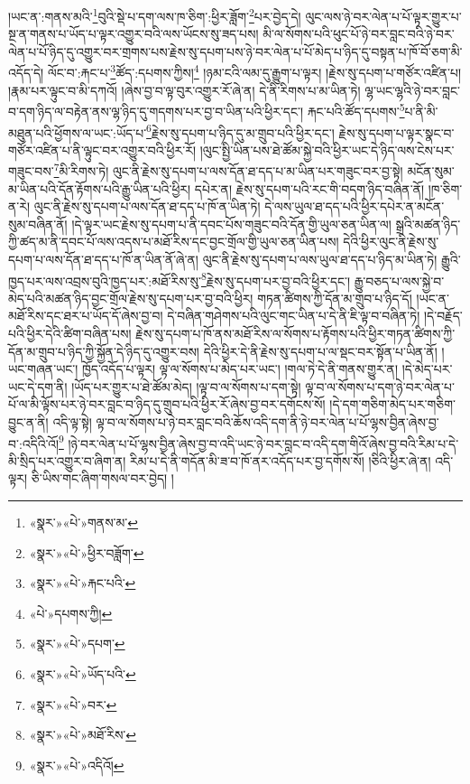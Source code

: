 །ཡང་ན་:གནས་མའི་\footnote{«སྣར་»«པེ་»གནས་མ་}བུའི་སྡེ་པ་དག་ལས་ཁ་ཅིག་:ཕྱིར་ཟློག་\footnote{«སྣར་»«པེ་»ཕྱིར་བཟློག་}པར་བྱེད་དེ། ལུང་ལས་ཉེ་བར་ལེན་པ་པོ་ལྟར་གྱུར་པ་སྔ་ན་གནས་པ་ཡོད་པ་ལྟར་འགྱུར་བའི་ལས་ཡོངས་སུ་ཟད་པས། མི་ལ་སོགས་པའི་ཕུང་པོ་ཉེ་བར་བླང་བའི་ཉེ་བར་ལེན་པ་པོ་ཉིད་དུ་འགྱུར་བར་གྲགས་པས་རྗེས་སུ་དཔག་པས་ཉེ་བར་ལེན་པ་པོ་མེད་པ་ཉིད་དུ་བསྟན་པ་ཁོ་བོ་ཅག་མི་འདོད་དེ། ལོང་བ་:རྐང་པ་\footnote{«སྣར་»«པེ་»རྐང་པའི་}ཚོད་:དཔགས་ཀྱིས།\footnote{«པེ་»དཔགས་ཀྱི།} །ཉམ་ངའི་ལམ་དུ་རྒྱུག་པ་ལྟར། །རྗེས་སུ་དཔག་པ་གཙོར་འཛིན་པ། །རྣམ་པར་ལྟུང་བ་མི་དཀའོ། །ཞེས་བྱ་བ་ལྟ་བུར་འགྱུར་རོ་ཞེ་ན། དེ་ནི་རིགས་པ་མ་ཡིན་ཏེ། ལྷ་ཡང་ལྷའི་ཉེ་བར་བླང་བ་དག་ཉིད་ལ་བརྟེན་ནས་ལྷ་ཉིད་དུ་གདགས་པར་བྱ་བ་ཡིན་པའི་ཕྱིར་དང་། རྐང་པའི་ཚོད་དཔགས་\footnote{«སྣར་»«པེ་»དཔག་}པ་ནི་མི་མཐུན་པའི་ཕྱོགས་ལ་ཡང་:ཡོད་པ་\footnote{«སྣར་»«པེ་»ཡོད་པའི་}རྗེས་སུ་དཔག་པ་ཉིད་དུ་མ་གྲུབ་པའི་ཕྱིར་དང་། རྗེས་སུ་དཔག་པ་ལྟར་སྣང་བ་གཙོར་འཛིན་པ་ནི་ལྟུང་བར་འགྱུར་བའི་ཕྱིར་རོ། །ལུང་སྤྱི་ཡིན་པས་ཐེ་ཚོམ་སྐྱེ་བའི་ཕྱིར་ཡང་དེ་ཉིད་ལས་ངེས་པར་གཟུང་བས་\footnote{«སྣར་»«པེ་»བར་}མི་རིགས་ཏེ། ལུང་ནི་རྗེས་སུ་དཔག་པ་ལས་དོན་ཐ་དད་པ་མ་ཡིན་པར་གཟུང་བར་བྱ་སྟེ། མངོན་སུམ་མ་ཡིན་པའི་དོན་རྟོགས་པའི་རྒྱུ་ཡིན་པའི་ཕྱིར། དཔེར་ན། རྗེས་སུ་དཔག་པའི་རང་གི་བདག་ཉིད་བཞིན་ནོ། །ཁ་ཅིག་ན་རེ། ལུང་ནི་རྗེས་སུ་དཔག་པ་ལས་དོན་ཐ་དད་པ་ཁོ་ན་ཡིན་ཏེ། དེ་ལས་ཡུལ་ཐ་དད་པའི་ཕྱིར་དཔེར་ན་མངོན་སུམ་བཞིན་ནོ། །དེ་ལྟར་ཡང་རྗེས་སུ་དཔག་པ་ནི་དབང་པོས་གཟུང་བའི་དོན་གྱི་ཡུལ་ཅན་ཡིན་ལ། སྒྲའི་མཚན་ཉིད་ཀྱི་ཚད་མ་ནི་དབང་པོ་ལས་འདས་པ་མཐོ་རིས་དང་བྱང་གྲོལ་གྱི་ཡུལ་ཅན་ཡིན་པས། དེའི་ཕྱིར་ལུང་ནི་རྗེས་སུ་དཔག་པ་ལས་དོན་ཐ་དད་པ་ཁོ་ན་ཡིན་ནོ་ཞེ་ན། ལུང་ནི་རྗེས་སུ་དཔག་པ་ལས་ཡུལ་ཐ་དད་པ་ཉིད་མ་ཡིན་ཏེ། རྒྱུའི་ཁྱད་པར་ལས་འབྲས་བུའི་ཁྱད་པར་:མཐོ་རིས་སུ་\footnote{«སྣར་»«པེ་»མཐོ་རིས་}རྗེས་སུ་དཔག་པར་བྱ་བའི་ཕྱིར་དང་། རྒྱུ་བཅད་པ་ལས་སྐྱེ་བ་མེད་པའི་མཚན་ཉིད་བྱང་གྲོལ་རྗེས་སུ་དཔག་པར་བྱ་བའི་ཕྱིར། གཏན་ཚིགས་ཀྱི་དོན་མ་གྲུབ་པ་ཉིད་དོ། །ཡང་ན་མཐོ་རིས་དང་ཐར་པ་ཡོད་དོ་ཞེས་བྱ་བ། དེ་བཞིན་གཤེགས་པའི་ལུང་གང་ཡིན་པ་དེ་ནི་ཇི་ལྟ་བ་བཞིན་ཏེ། །དེ་བརྗོད་པའི་ཕྱིར་དེའི་ཚིག་བཞིན་པས། རྗེས་སུ་དཔག་པ་ཁོ་ནས་མཐོ་རིས་ལ་སོགས་པ་རྟོགས་པའི་ཕྱིར་གཏན་ཚིགས་ཀྱི་དོན་མ་གྲུབ་པ་ཉིད་ཀྱི་སྐྱོན་དེ་ཉིད་དུ་འགྱུར་བས། དེའི་ཕྱིར་དེ་ནི་རྗེས་སུ་དཔག་པ་ལ་སྡང་བར་སྟོན་པ་ཡིན་ནོ། །ཡང་གཞན་ཡང་། ཁྱོད་འདོད་པ་ལྟར། ལྟ་ལ་སོགས་པ་མེད་པར་ཡང་། །གལ་ཏེ་དེ་ནི་གནས་གྱུར་ན། །དེ་མེད་པར་ཡང་དེ་དག་ནི། །ཡོད་པར་གྱུར་པ་ཐེ་ཚོམ་མེད། །ལྟ་བ་ལ་སོགས་པ་དག་སྟེ། ལྟ་བ་ལ་སོགས་པ་དག་ཉེ་བར་ལེན་པ་པོ་ལ་མི་ལྟོས་པར་ཉེ་བར་བླང་བ་ཉིད་དུ་གྲུབ་པའི་ཕྱིར་རོ་ཞེས་བྱ་བར་དགོངས་སོ། །དེ་དག་གཅིག་མེད་པར་གཅིག་བྱུང་ན་ནི། འདི་ལྟ་སྟེ། ལྟ་བ་ལ་སོགས་པ་ཉེ་བར་བླང་བའི་ཆོས་འདི་དག་ནི་ཉེ་བར་ལེན་པ་པོ་ལྷས་བྱིན་ཞེས་བྱ་བ་:འདིའི་འོ།\footnote{«སྣར་»«པེ་»འདིའོ།} །ཉེ་བར་ལེན་པ་པོ་ལྷས་བྱིན་ཞེས་བྱ་བ་འདི་ཡང་ཉེ་བར་བླང་བ་འདི་དག་གིའོ་ཞེས་བྱ་བའི་རིམ་པ་དེ་མི་སྲིད་པར་འགྱུར་བ་ཞིག་ན། རིམ་པ་དེ་ནི་གདོན་མི་ཟ་བ་ཁོ་ནར་འདོད་པར་བྱ་དགོས་སོ། །ཅིའི་ཕྱིར་ཞེ་ན། འདི་ལྟར། ཅི་ཡིས་གང་ཞིག་གསལ་བར་བྱེད། །
